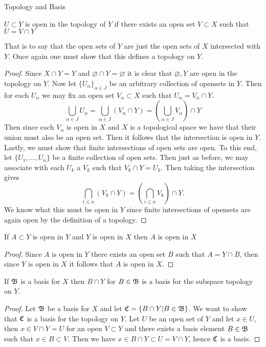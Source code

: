 \begin{chapter}{Topology and Basis}
   
   \begin{defn}
    $U \subset Y$ is open in the topology of $Y$ if there exists an open set $V \subset X$ such that $U = V \cap Y$
   \end{defn}

   That is to say that the open sets of $Y$ are just the open sets of $X$ intersected with $Y$. Once again one must show that this defines a topology on $Y$. 
   \begin{proof}
    Since $X \cap Y = Y $ and $\varnothing \cap Y = \varnothing$ it is clear that $\varnothing, Y$ are open in the topology on $Y$. 
    Now let $\{U_\alpha\}_{\alpha \in J}$ be an arbitrary collection of opensets in $Y$. Then for each $U_\alpha$ we may fix an open set $V_\alpha \subset X$ such that $U_\alpha = V_\alpha \cap Y$. 
    \[\bigcup_{\alpha \in J} U_\alpha = \bigcup_{\alpha \in J} (V_\alpha \cap Y) = \left(\bigcup_{\alpha \in J} V_\alpha \right) \cap Y\]
    Then since each $V_\alpha$ is open in $X$ and $X$ is a topological space we have that their union must also be an open set. Then it follows that the intersection is open in $Y$. 
    Lastly, we must show that finite intersections of open sets are open. To this end, let $\{U_1, \dots , U_n \}$ be a finite collection of open sets. 
    Then just as before, we may associate with each $U_k$ a $V_k$ such that $V_k \cap Y = U_k$. Then taking the intersection gives 
    \[\bigcap_{i \leq n} (V_k \cap Y) = \left( \bigcap_{i \leq n} V_k \right) \cap Y.\]
    We know what this must be open in $Y$ since finite intersections of opensets are again open by the definition of a topology. 
   \end{proof}
   
   \begin{thm}
    If $A \subset Y$ is open in $Y$ and $Y$ is open in $X$ then $A$ is open in $X$
   \end{thm}

   
   \begin{proof}
    Since $A$ is open in $Y$ there exists an open set $B$ such that $A = Y \cap B$, then since $Y$ is open in $X$ it follows that $A$ is open in $X$. 
   \end{proof}


   \begin{thm}
    If $\mathfrak{B}$ is a basis for $X$ then $B \cap Y$ for $B \in \mathfrak{B}$ is a basis for the subspace topology on $Y$. 
   \end{thm}

   \begin{proof}
    Let $\mathfrak{B}$ be a basis for $X$ and let $\mathfrak{C} = \{B \cap Y | B \in \mathfrak{B} \}$. We want to show that $\mathfrak{C}$ is a basis for the topology on $Y$. Let $U$ be an open set of $Y$ and let $x \in U$, then $x \in V \cap Y = U$ for an open $V \subset Y$ and there exists a basis element $B \in \mathfrak{B}$ such that 
    $x \in B \subset V$. Then we have $x \in B \cap Y \subset U = V \cap Y$, hence $\mathfrak{C}$ is a basis. 
   \end{proof}
   

\end{chapter}

